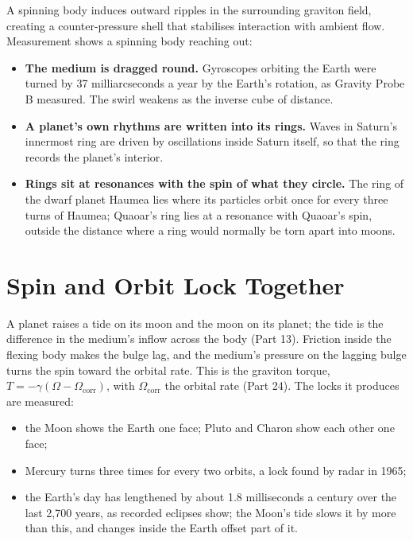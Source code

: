 \documentclass[11pt,a4paper]{article}
\begin{document}
A spinning body induces outward ripples in the surrounding graviton field, creating a counter-pressure shell that stabilises interaction with ambient flow.  Measurement shows a spinning body reaching out:
\begin{itemize}
\item \textbf{The medium is dragged round.} Gyroscopes orbiting the Earth were turned by 37 milliarcseconds a year by the Earth's rotation, as Gravity Probe B measured. The swirl weakens as the inverse cube of distance.
\item \textbf{A planet's own rhythms are written into its rings.} Waves in Saturn's innermost ring are driven by oscillations inside Saturn itself, so that the ring records the planet's interior.
\item \textbf{Rings sit at resonances with the spin of what they circle.} The ring of the dwarf planet Haumea lies where its particles orbit once for every three turns of Haumea; Quaoar's ring lies at a resonance with Quaoar's spin, outside the distance where a ring would normally be torn apart into moons.
\end{itemize}

\section{Spin and Orbit Lock Together}
\label{sec:lock}

 A planet raises a tide on its moon and the moon on its planet; the tide is the difference in the medium's inflow across the body (Part 13). Friction inside the flexing body makes the bulge lag, and the medium's pressure on the lagging bulge turns the spin toward the orbital rate. This is the graviton torque, $T=-\gamma(\Omega-\Omega_{\text{corr}})$, with $\Omega_{\text{corr}}$ the orbital rate (Part 24). The locks it produces are measured:
\begin{itemize}
\item the Moon shows the Earth one face; Pluto and Charon show each other one face;
\item Mercury turns three times for every two orbits, a lock found by radar in 1965;
\item the Earth's day has lengthened by about 1.8 milliseconds a century over the last 2,700 years, as recorded eclipses show; the Moon's tide slows it by more than this, and changes inside the Earth offset part of it.
\end{itemize}
\end{document}
